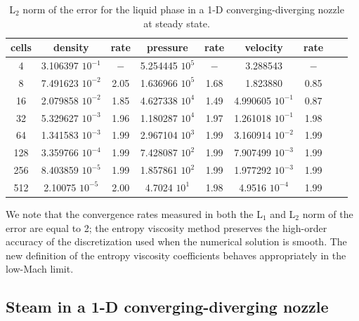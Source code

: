 \documentclass[preprint,10pt]{elsarticle}
\newcommand{\tcr}[1]{\textcolor{red}{#1}}
\newcommand{\tcb}[1]{\textcolor{blue}{#1}}
\begin{document}
%
%
\begin{table}[H]
\begin{center}
 \caption{\label{tbl:l2_norm_liq} L$_2$ norm of the error for the liquid phase in a 1-D converging-diverging nozzle at steady state.}
 \begin{tabular}{|c|c|c|c|c|c|c|c|c|}
 \hline
cells& density            & rate & pressure          & rate & velocity           & rate \\ \hline
4    & 3.106397 $10^{-1}$ & $-$  & 5.254445 $10^{5}$ & $-$  & 3.288543           & $-$  \\ \hline
8    & 7.491623 $10^{-2}$ & 2.05 & 1.636966 $10^{5}$ & 1.68 & 1.823880           & 0.85 \\ \hline
16   & 2.079858 $10^{-2}$ & 1.85 & 4.627338 $10^{4}$ & 1.49 & 4.990605 $10^{-1}$ & 0.87 \\ \hline
32   & 5.329627 $10^{-3}$ & 1.96 & 1.180287 $10^{4}$ & 1.97 & 1.261018 $10^{-1}$ & 1.98 \\ \hline
64   & 1.341583 $10^{-3}$ & 1.99 & 2.967104 $10^{3}$ & 1.99 & 3.160914 $10^{-2}$ & 1.99 \\ \hline
128  & 3.359766 $10^{-4}$ & 1.99 & 7.428087 $10^{2}$ & 1.99 & 7.907499 $10^{-3}$ & 1.99 \\ \hline
256  & 8.403859 $10^{-5}$ & 1.99 & 1.857861 $10^{2}$ & 1.99 & 1.977292 $10^{-3}$ & 1.99 \\ \hline
512  & 2.10075  $10^{-5}$ & 2.00 & 4.7024   $10^{1}$ & 1.98 & 4.9516   $10^{-4}$ & 1.99 \\ \hline
\end{tabular}
\end{center}
\end{table}
We note that the convergence rates measured in both the L$_1$ and L$_2$ norm of the error are equal to 2; the entropy viscosity method preserves 
the high-order accuracy of the discretization used when the numerical solution is smooth. The new definition of the entropy viscosity coefficients behaves 
appropriately in the low-Mach limit.

\subsection{Steam in a 1-D converging-diverging nozzle} \label{sec:steam_nozzle}
\end{document}
